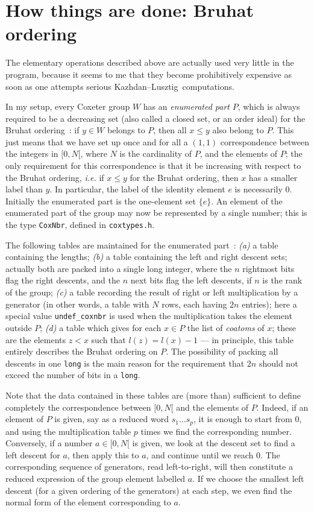 \documentclass[11pt]{article}
\newcommand{\kl}{Kazh\-dan--Lusz\-tig}
\begin{document}
\section{How things are done: Bruhat ordering}\label{section:bruhat}

The elementary operations described above are actually used very little in
the program, because it seems to me that they become prohibitively expensive
as soon as one attempts serious \kl\ computations.

In my setup, every Coxeter group $W$ has an {\em enumerated part} $P$, which is
always required to be a decreasing set (also called a closed set, or an order
ideal) for the Bruhat ordering~: if $y\in W$ belongs to $P$, then all $x\leq y$
also belong to $P$. This just means that we have set up once and for all
a $(1,1)$ correspondence between the integers in $[0,N[$, where $N$ is the
cardinality of $P$, and the elements of $P$; the only requirement for this
correspondence is that it be increasing with respect to the Bruhat ordering,
{\em i.e.} if $x\leq y$ for the Bruhat ordering, then $x$ has a smaller label
than $y$. In particular, the label of the identity element $e$ is necessarily
$0$. Initially the enumerated part is the one-element set $\{e\}$. An
element of the enumerated part of the group may now be represented by a
single number; this is the type {\tt CoxNbr}, defined in {\tt coxtypes.h}.

The following tables are maintained for the enumerated part~: {\it (a)} a
table containing the lengths; {\it (b)} a table containing the left and
right descent sets; actually both are packed into a single long integer,
where the $n$ rightmost bits flag the right descents, and the $n$ next
bits flag the left descents, if $n$ is the rank of the group;
{\it (c)} a table recording the result of right or left multiplication by
a generator (in other words, a table with $N$ rows, each having $2n$ entries);
here a special value {\tt undef\_coxnbr} is used when the multiplication takes
the element outside $P$; {\it (d)} a table which gives for each $x\in P$ the
list of {\em coatoms} of $x$; these are the elements $z<x$ such that
$l(z)=l(x)-1$ --- in principle, this table entirely describes the Bruhat
ordering on $P$. The possibility of packing all descents in one {\tt long} is
the main reason for the requirement that $2n$ should not exceed the number of
bits in a {\tt long}.

Note that the data contained in these tables are (more than) sufficient to
define completely the correspondence between $[0,N[$ and the elements of
$P$. Indeed, if an element of $P$ is given, say as a reduced word
$s_1\ldots s_p$, it is enough to start from $0$, and using the multiplication
table $p$ times we find the corresponding number. Conversely, if a number
$a\in[0,N[$ is given, we look at the descent set to find a left descent for
$a$, then apply this to $a$, and continue until we reach $0$. The corresponding
sequence of generators, read left-to-right, will then constitute a reduced
expression of the group element labelled $a$. If we choose the
smallest left descent (for a given ordering of the generators) at each step,
we even find the normal form of the element corresponding to $a$.
\end{document}
